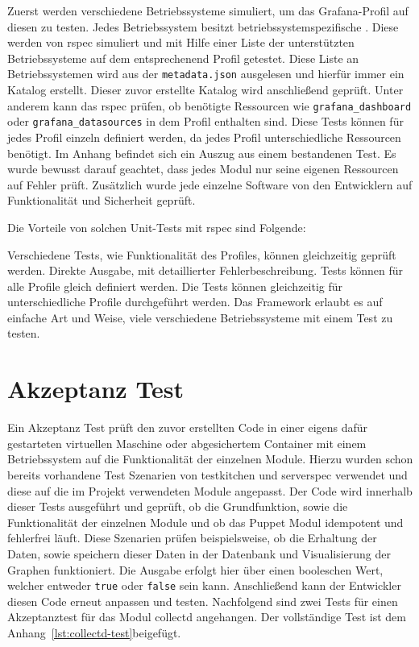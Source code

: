 Zuerst werden verschiedene Betriebssysteme simuliert, um das Grafana-Profil auf
diesen zu testen. Jedes Betriebssystem besitzt betriebssystemspezifische
. Diese werden von rspec simuliert und mit Hilfe einer
Liste der unterstützten Betriebssysteme auf dem entsprechenend Profil
getestet. Diese Liste an Betriebssystemen wird aus der \texttt{metadata.json}
ausgelesen und hierfür immer ein Katalog erstellt. Dieser zuvor erstellte
Katalog wird anschließend geprüft. Unter anderem kann das rspec prüfen, ob
benötigte Ressourcen wie \texttt{grafana\_dashboard} oder
\texttt{grafana\_datasources} in dem Profil enthalten sind. Diese Tests können
für jedes Profil einzeln definiert werden, da jedes Profil unterschiedliche
Ressourcen benötigt. Im Anhang befindet sich ein Auszug aus einem bestandenen
Test. Es wurde bewusst darauf geachtet, dass jedes Modul nur seine eigenen
Ressourcen auf Fehler prüft. Zusätzlich wurde jede einzelne Software
von den Entwicklern auf Funktionalität und Sicherheit geprüft.

Die Vorteile von solchen Unit-Tests mit rspec sind Folgende:

\begin{outline}
  \1 Verschiedene Tests, wie Funktionalität des Profiles, können gleichzeitig
  geprüft werden.
  \1 Direkte Ausgabe, mit detaillierter Fehlerbeschreibung.
  \1 Tests können für alle Profile gleich definiert werden.
  \1 Die Tests können gleichzeitig für unterschiedliche Profile durchgeführt
  werden.
  \1 Das Framework erlaubt es auf einfache Art und Weise, viele verschiedene
  Betriebssysteme mit einem Test zu testen.
\end{outline}
\mr%

\section{Akzeptanz Test}
Ein Akzeptanz Test prüft den zuvor erstellten Code in einer eigens dafür
gestarteten virtuellen Maschine oder abgesichertem Container mit einem
Betriebssystem auf die Funktionalität der einzelnen Module. Hierzu wurden schon
bereits vorhandene Test Szenarien von \gls{testkitchen} und \gls{serverspec}
verwendet und diese auf die im Projekt verwendeten Module angepasst. Der Code
wird innerhalb dieser Tests ausgeführt und geprüft, ob die Grundfunktion, sowie
die Funktionalität der einzelnen Module und ob das Puppet Modul idempotent und
fehlerfrei läuft. Diese Szenarien prüfen beispielsweise, ob die Erhaltung der
Daten, sowie speichern dieser Daten in der Datenbank und Visualisierung der
Graphen funktioniert. Die Ausgabe erfolgt hier über einen booleschen Wert,
welcher entweder \texttt{true} oder \texttt{false} sein kann. Anschließend
kann der Entwickler diesen Code erneut anpassen und testen. Nachfolgend sind
zwei Tests für einen Akzeptanztest für das Modul collectd angehangen. Der
vollständige Test ist dem Anhang~\ref{lst:collectd-test}beigefügt.

